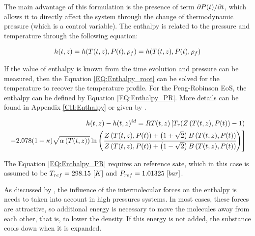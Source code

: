 \documentclass[../Article_Model_Parameters.tex]{subfiles}
\begin{document}
			The main advantage of this formulation is the presence of term $\partial {\color{black}P}(t) / \partial t $, which allows it to directly affect the system through the change of thermodynamic pressure (which is a control variable). The enthalpy is related to the pressure and temperature through the following equation:
			
			{\footnotesize
				\begin{equation}
					{\color{black}h}(t,z)={\color{black}h}(T(t,z),{\color{black}P}(t),\rho_f)={\color{black}h}( T(t,z),{\color{black}P}(t), \rho_f ) 
					\label{EQ:Enthalpy_root}
				\end{equation}
			}
		
			If the value of enthalpy is known from the time evolution and pressure can be measured, then the Equation \ref{EQ:Enthalpy_root} can be solved for the temperature to recover the temperature profile. For the Peng-Robinson EoS, the enthalpy can be defined by Equation \ref{EQ:Enthalpy_PR}. More details can be found in Appendix \ref{CH:Enthalpy} or given by \citet{Gmehling2019}.
			
			{\scriptsize
				\begin{equation}
					\begin{split}
					{\color{black}h}(t,z)-{\color{black}h}(t,z)^{id}={\color{black}R}T(t,z) \left[{\color{black}T_r}({\color{black}Z}\left(T(t,z), {\color{black}P}(t)\right)-1) \right. \\
					\left. -2.078(1+{\color{black}\kappa} ){\sqrt { {\color{black}\alpha}\left(T(t,z)\right) } } \ln \left(\cfrac{{\color{black}Z}\left(T(t,z), {\color{black}P}(t)\right)+\left( 1+\sqrt{2} \right){\color{black}B}\left(T(t,z), {\color{black}P}(t)\right)}{{\color{black}Z}\left(T(t,z), {\color{black}P}(t)\right)+\left( 1-\sqrt{2} \right){\color{black}B}\left(T(t,z), {\color{black}P}(t)\right)}\right)\right]
					\label{EQ:Enthalpy_PR}
				\end{split}
			\end{equation}				
			}
		
			The Equation \ref{EQ:Enthalpy_PR} requires an reference sate, which in this case is assumed to be ${\color{black}T_{ref}}=298.15~[K]$ and ${\color{black}P_{ref}}=1.01325~[bar]$.
			
			As discussed by \citet{Gmehling2019}, the influence of the intermolecular forces on the enthalpy is needs to taken into account in high pressures systems. In most cases, these forces are attractive, so additional energy is necessary to move the molecules away from each other, that is, to lower the density. If this energy is not added, the substance cools down when it is expanded.
			
\end{document}
